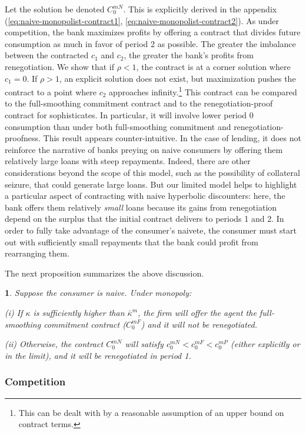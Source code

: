 \documentclass[11pt,english]{article}
\theoremstyle{plain}
\newtheorem{prop}{\protect\propositionname}
\theoremstyle{definition}
\providecommand{\propositionname}{Proposition}
\begin{document}
Let the solution be denoted $C_{0}^{mN}$. This is explicitly derived
in the appendix (\ref{eq:naive-monopolist-contract1}, \ref{eq:naive-monopolist-contract2}).
As under competition, the bank maximizes profits by offering a contract
that divides future consumption as much in favor of period 2 as possible.
The greater the imbalance between the contracted $c_{1}$ and $c_{2}$,
the greater the bank's profits from renegotiation.
We show that if $\rho<1$, the contract is at a corner solution
where $c_{1}=0$. If $\rho>1$, an explicit solution does not exist,
but maximization pushes the contract to a point where $c_{2}$ approaches
infinity.\footnote{This can be dealt with by a reasonable assumption of an upper bound
on contract terms.} 
This contract can be compared to the full-smoothing commitment contract
and to the renegotiation-proof contract for sophisticates. In particular,
it will involve lower period 0 consumption than under both full-smoothing
commitment and renegotiation-proofness. This result appears counter-intuitive.
In the case of lending, it does not reinforce the narrative of banks
preying on naive consumers by offering them relatively large loans
with steep repayments. Indeed, there are other considerations beyond
the scope of this model, such as the possibility of collateral seizure,
that could generate large loans. But our limited model helps to highlight
a particular aspect of contracting with naive hyperbolic discounters:
here, the bank offers them relatively \emph{small} loans because its
gains from renegotiation depend on the surplus that the initial contract
delivers to periods 1 and 2. In order to fully take advantage of the
consumer's naivete, the consumer must start out with sufficiently
small repayments that the bank could profit from rearranging them.

The next proposition summarizes the above discussion. 
\begin{prop}
Suppose the consumer is naive. Under monopoly:

(i) If $\kappa$ is sufficiently higher than $\bar{\kappa}^{m}$,
the firm will offer the agent the full-smoothing commitment contract
($C_{0}^{mF}$) and it will not be renegotiated. 

(ii) Otherwise, the contract $C_{0}^{mN}$ will satisfy $c_{0}^{mN}<c_{0}^{mF}<c_{0}^{mP}$
(either explicitly or in the limit), and it will be renegotiated in
period 1. 
\end{prop}

\subsubsection{Competition}
\end{document}
